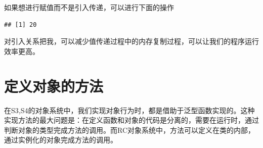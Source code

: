 \documentclass[]{book}
\newenvironment{Shaded}{\begin{snugshade}}{\end{snugshade}}
\newcommand{\KeywordTok}[1]{\textcolor[rgb]{0.13,0.29,0.53}{\textbf{#1}}}
\newcommand{\DecValTok}[1]{\textcolor[rgb]{0.00,0.00,0.81}{#1}}
\newcommand{\StringTok}[1]{\textcolor[rgb]{0.31,0.60,0.02}{#1}}
\newcommand{\CommentTok}[1]{\textcolor[rgb]{0.56,0.35,0.01}{\textit{#1}}}
\newcommand{\OperatorTok}[1]{\textcolor[rgb]{0.81,0.36,0.00}{\textbf{#1}}}
\newcommand{\NormalTok}[1]{#1}
\begin{document}
如果想进行赋值而不是引入传递，可以进行下面的操作

\begin{Shaded}
\end{Shaded}

\begin{verbatim}
## [1] 20
\end{verbatim}

\begin{Shaded}
\end{Shaded}

对引入关系把我，可以减少值传递过程中的内存复制过程，可以让我们的程序运行效率更高。

\section{定义对象的方法}

在S3,S4的对象系统中，我们实现对象行为时，都是借助于泛型函数实现的。这种实现方法的最大问题是：在定义函数和对象的代码是分离的，需要在运行时，通过判断对象的类型完成方法的调用。而RC对象系统中，方法可以定义在类的内部，通过实例化的对象完成方法的调用。
\end{document}
